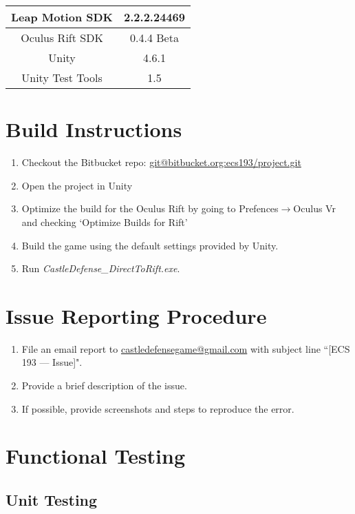 \begin{table}[h]
	\renewcommand*{\arraystretch}{1.5}
	\centering
	\begin{tabular}{| c | c |}
		\hline
		Leap Motion SDK		&	2.2.2.24469\\
		\hline
		Oculus Rift SDK		&	0.4.4 Beta\\
		\hline
		Unity				&	4.6.1\\
		\hline
		Unity Test Tools	&	1.5\\
		\hline
	\end{tabular}
\end{table}


\section{Build Instructions}

\begin{enumerate}
	\item Checkout the Bitbucket repo: \url{git@bitbucket.org:ecs193/project.git}
	\item Open the project in Unity
	\item Optimize the build for the Oculus Rift by going to Prefences$\rightarrow$Oculus Vr and checking `Optimize Builds for Rift'
	\item Build the game using the default settings provided by Unity. 
	\item Run \textit{CastleDefense\_DirectToRift.exe}.
\end{enumerate}

\section{Issue Reporting Procedure}

\begin{enumerate}
	\item File an email report to \url{castledefensegame@gmail.com} with subject line ``[ECS 193 --- Issue]".
	\item Provide a brief description of the issue.
	\item If possible, provide screenshots and steps to reproduce the error.
\end{enumerate}

\section{Functional Testing}

\subsection{Unit Testing}

